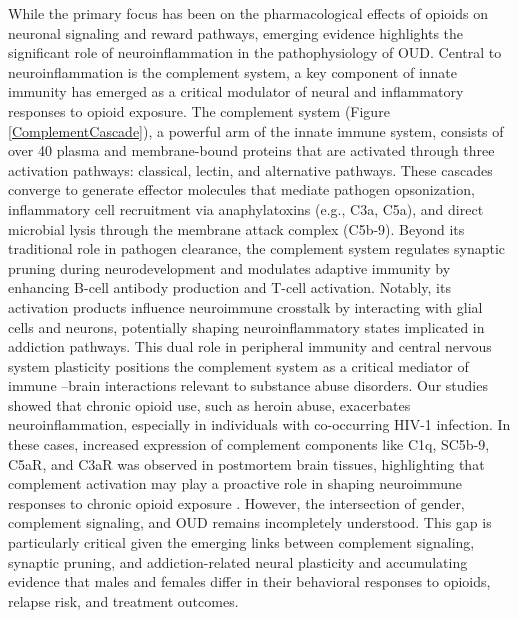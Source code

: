 \documentclass[10pt,letterpaper]{article}
\begin{document}
While the primary focus has been on the pharmacological effects of opioids on neuronal signaling and reward pathways, emerging evidence highlights the significant role of neuroinflammation in the pathophysiology of OUD. Central to neuroinflammation is the complement system, a key component of innate immunity has emerged as a critical modulator of neural and inflammatory responses to opioid exposure. The complement system (Figure \ref{ComplementCascade}), a powerful arm of the innate immune system, consists of over 40 plasma and membrane-bound proteins that are activated through three activation pathways: classical, lectin, and alternative pathways. These cascades converge to generate effector molecules that mediate pathogen opsonization, inflammatory cell recruitment via anaphylatoxins (e.g., C3a, C5a), and direct microbial lysis through the membrane attack complex (C5b-9). Beyond its traditional role in pathogen clearance, the complement system regulates synaptic pruning during neurodevelopment and modulates adaptive immunity by enhancing B-cell antibody production and T-cell activation. Notably, its activation products influence neuroimmune crosstalk by interacting with glial cells and neurons, potentially shaping neuroinflammatory states implicated in addiction pathways. This dual role in peripheral immunity and central nervous system plasticity positions the complement system as a critical mediator of immune –brain interactions relevant to substance abuse disorders. Our studies showed that chronic opioid use, such as heroin abuse, exacerbates neuroinflammation, especially in individuals with co-occurring HIV-1 infection. In these cases, increased expression of complement components like C1q, SC5b-9, C5aR, and C3aR was observed in postmortem brain tissues, highlighting that complement activation may play a proactive role in shaping neuroimmune responses to chronic opioid exposure \cite{Mahajan2017}. However, the intersection of gender, complement signaling, and OUD remains incompletely understood. This gap is particularly critical given the emerging links between complement signaling, synaptic pruning, and addiction-related neural plasticity and accumulating evidence that males and females differ in their behavioral responses to opioids, relapse risk, and treatment outcomes.
\end{document}
